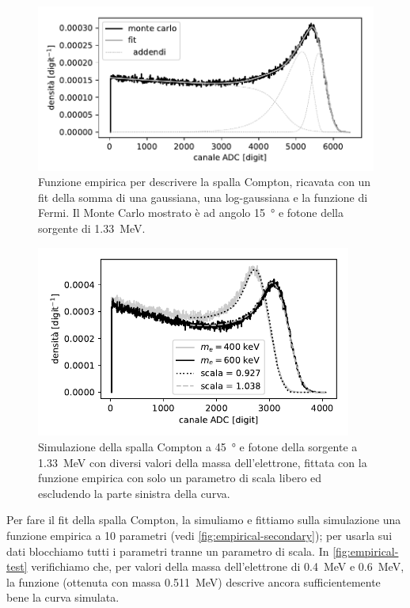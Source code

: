 \begin{figure}
	\centering
	\includegraphics[width=33em]{empirical-secondary}
	\caption{\label{fig:empirical-secondary}
	Funzione empirica per descrivere la spalla Compton,
	ricavata con un fit della somma di una gaussiana, una log-gaussiana e la funzione di Fermi.
	Il Monte Carlo mostrato è ad angolo \SI{15}{\degree} e fotone della sorgente di \SI{1.33}{MeV}.}
\end{figure}

\begin{figure}
	\centering
	\includegraphics[width=28em]{empirical-test}
	\caption{\label{fig:empirical-test}
	Simulazione della spalla Compton a \SI{45}{\degree} e fotone della sorgente a \SI{1.33}{MeV}
	con diversi valori della massa dell'elettrone,
	fittata con la funzione empirica con solo un parametro di scala libero
	ed escludendo la parte sinistra della curva.}
\end{figure}

Per fare il fit della spalla Compton,
la simuliamo e fittiamo sulla simulazione una funzione empirica a 10 parametri
(vedi \autoref{fig:empirical-secondary});
per usarla sui dati blocchiamo tutti i parametri tranne un parametro di scala.
In \autoref{fig:empirical-test} verifichiamo che,
per valori della massa dell'elettrone di \SI{0.4}{MeV} e \SI{0.6}{MeV},
la funzione (ottenuta con massa \SI{0.511}{MeV}) descrive ancora sufficientemente bene la curva simulata.

